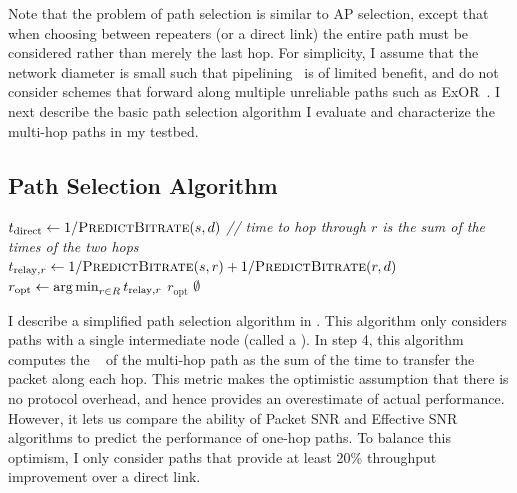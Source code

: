 Note that the problem of path selection is similar to AP selection, except that when choosing between repeaters (or a direct link) the entire path must be considered rather than merely the last hop. For simplicity, I assume that the network diameter is small such that pipelining~\cite{Rodrig_thesis} is of limited benefit, and do not consider schemes that forward along multiple unreliable paths such as ExOR~\cite{Biswas_ExOR}. I next describe the basic path selection algorithm I evaluate and characterize the multi-hop paths in my testbed.


\subsection{Path Selection Algorithm}
\begin{algorithm}[tp]
\caption{\label{alg:relay_sel_basic}}
\begin{algorithmic}[1]
\STATE $t_\text{direct} \gets 1/\textsc{PredictBitrate}(s,d)$ 
\STATE \emph{// time to hop through $r$ is the sum of the times of the two hops}
\STATE $t_{\text{relay},r} \gets 1/\textsc{PredictBitrate}(s,r) + 1/\textsc{PredictBitrate}(r,d)$
\ENDFOR
\STATE $r_\text{opt} \gets \operatorname*{arg\,min}_{r\in R} t_{\text{relay},r}$ 
\RETURN $r_\text{opt}$ 
\ELSE
\RETURN $\emptyset$ 
\ENDIF
\end{algorithmic}
\end{algorithm}

I describe a simplified path selection algorithm in . This  algorithm only considers paths with a single intermediate node (called a ). In step 4, this algorithm computes the ~\cite{Draves_ETT} of the multi-hop path as the sum of the time to transfer the packet along each hop. This metric makes the optimistic assumption that there is no protocol overhead, and hence provides an overestimate of actual performance. However, it lets us compare the ability of Packet SNR and Effective SNR algorithms to predict the performance of one-hop paths. To balance this optimism, I only consider paths that provide at least 20\% throughput improvement over a direct link.

